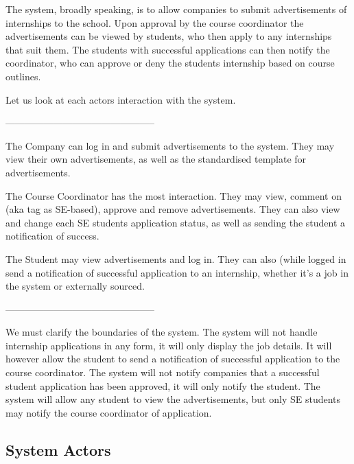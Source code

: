 \documentclass{l3deliverable}
\begin{document}


The system, broadly speaking, is to allow companies to submit advertisements 
of internships to the school. Upon approval by the course coordinator the 
advertisements can be viewed by students, who then apply to any internships 
that suit them. The students with successful applications can then notify 
the coordinator, who can approve or deny the students internship based on 
course outlines. 

Let us look at each actors interaction with the system.

-----------------------------------------------

The Company can log in and submit advertisements to the system. They may 
view their own advertisements, as well as the standardised template for 
advertisements.

The Course Coordinator has the most interaction. They may view, comment 
on (aka tag as SE-based), approve and remove advertisements. They can also 
view and change each SE students application status, as well as sending 
the student a notification of success.

The Student may view advertisements and log in. They can also (while logged 
in send a notification of successful application to an internship, whether 
it's a job in the system or externally sourced.

-----------------------------------------------

We must clarify the boundaries of the system. The system will not 
handle internship applications in any form, it will only display the 
job details. It will however allow the student to send a notification 
of successful application to the course coordinator. The system will 
not notify companies that a successful student application has been 
approved, it will only notify the student. The system will allow any 
student to view the advertisements, but only SE students may notify 
the course coordinator of application.


\subsection{System Actors}
\end{document}
